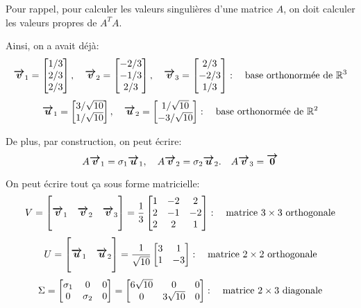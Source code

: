 \documentclass[a4paper]{article}
\begin{document}
{    Pour rappel, pour calculer les valeurs singulières d'une matrice $A$, on doit calculer les valeurs propres de $A^T A$.

    Ainsi, on a avait déjà:
    \[\bm{\protect\overrightarrow{v}}_1 = \begin{bmatrix} 1 / 3 \\  2 / 3 \\ 2 / 3\end{bmatrix}, \quad \bm{\protect\overrightarrow{v}}_2 = \begin{bmatrix} -2 / 3 \\ -1 / 3 \\ 2 / 3 \end{bmatrix}, \quad \bm{\protect\overrightarrow{v}}_3 = \begin{bmatrix} 2 / 3 \\ -2 / 3 \\ 1 / 3 \end{bmatrix}: \quad \text{base orthonormée de } \mathbb{R}^3\]
    \[\bm{\protect\overrightarrow{u}}_1 = \begin{bmatrix} 3 / \sqrt{10} \\ 1 / \sqrt{10} \end{bmatrix}, \quad \bm{\protect\overrightarrow{u}}_2 = \begin{bmatrix} 1 / \sqrt{10} \\ -3 / \sqrt{10} \end{bmatrix}: \quad \text{base orthonormée de } \mathbb{R}^2\]

    De plus, par construction, on peut écrire:
    \[A \bm{\protect\overrightarrow{v}}_1 = \sigma_1 \bm{\protect\overrightarrow{u}}_1, \quad A \bm{\protect\overrightarrow{v}}_2 = \sigma_2 \bm{\protect\overrightarrow{u}}_2. \quad A \bm{\protect\overrightarrow{v}}_3 = \bm{\protect\overrightarrow{0}}\]

    On peut écrire tout ça sous forme matricielle:
    \[V = \begin{bmatrix}  &  &  \\ \bm{\protect\overrightarrow{v}}_1 & \bm{\protect\overrightarrow{v}}_2 & \bm{\protect\overrightarrow{v}}_3 \\  &  &  \end{bmatrix} = \frac{1}{3} \begin{bmatrix} 1 & -2 & 2 \\ 2 & -1 & -2 \\ 2 & 2 & 1 \end{bmatrix}: \quad \text{matrice $3\times3$ orthogonale}\]
    \[U = \begin{bmatrix}  &  \\ \bm{\protect\overrightarrow{u}}_1 & \bm{\protect\overrightarrow{u}}_2 \\  &  \end{bmatrix} = \frac{1}{\sqrt{10}} \begin{bmatrix} 3 & 1 \\ 1 & -3 \end{bmatrix}: \quad \text{matrice $2 \times2$ orthogonale} \]
    \[\Sigma = \begin{bmatrix} \sigma_1 & 0 & 0 \\ 0 & \sigma_2 & 0 \end{bmatrix} = \begin{bmatrix} 6 \sqrt{10} & 0 & 0 \\ 0 & 3\sqrt{10} & 0 \end{bmatrix}: \quad \text{matrice $2 \times 3$ diagonale}\]

}
\end{document}
